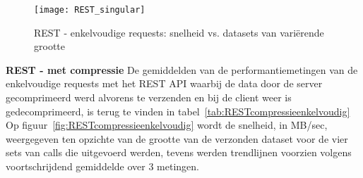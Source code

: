 \begin{figure}[ht]
    \centering
    \texttt{[image: REST\_singular]}
    \caption{REST - enkelvoudige requests: snelheid vs. datasets van vari\"erende grootte}
    \label{fig:RESTenkelvoudig}
\end{figure}

\textbf{REST - met compressie}\newline
De gemiddelden van de performantiemetingen van de enkelvoudige requests met het REST API waarbij de data door de server gecomprimeerd werd alvorens te verzenden
en bij de client weer is gedecomprimeerd, is terug te vinden in tabel~\ref{tab:RESTcompressieenkelvoudig}
Op figuur~\ref{fig:RESTcompressieenkelvoudig} wordt de snelheid, in MB/sec, weergegeven ten opzichte van de grootte van de verzonden dataset voor de vier sets van
calls die uitgevoerd werden, tevens werden trendlijnen voorzien volgens voortschrijdend gemiddelde over 3 metingen.\\

